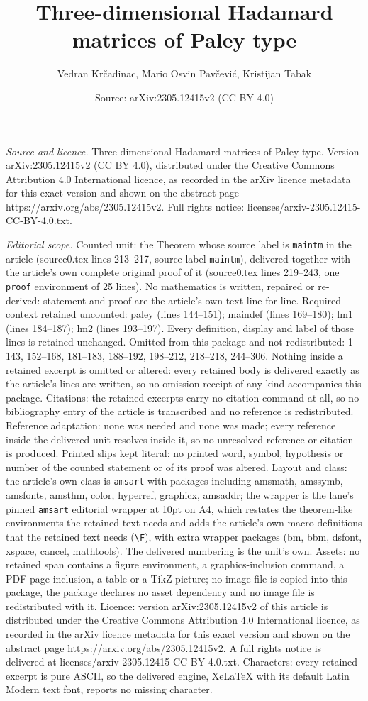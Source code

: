 \documentclass[10pt,a4paper]{amsart}
\title[Three-dimensional Hadamard matrices of Paley type]{Three-dimensional Hadamard matrices of Paley type}
\author{Vedran Kr\v{c}adinac, Mario Osvin Pav\v{c}evi\'c, Kristijan Tabak}
\date{Source: arXiv:2305.12415v2 (CC BY 4.0)}
\begin{document}
\maketitle

\noindent\emph{Source and licence.} Three-dimensional Hadamard matrices of Paley type. Version arXiv:2305.12415v2 (CC BY 4.0), distributed under the Creative Commons Attribution 4.0 International licence, as recorded in the arXiv licence metadata for this exact version and shown on the abstract page https://arxiv.org/abs/2305.12415v2. Full rights notice: licenses/arxiv-2305.12415-CC-BY-4.0.txt.\par\smallskip

\noindent\textit{Editorial scope.} Counted unit: the Theorem whose source label is \texttt{maintm} in the article (source0.tex lines 213--217, source label \texttt{maintm}), delivered together with the article's own complete original proof of it (source0.tex lines 219--243, one \texttt{proof} environment of 25 lines). No mathematics is written, repaired or re-derived: statement and proof are the article's own text line for line. Required context retained uncounted: paley (lines 144--151); maindef (lines 169--180); lm1 (lines 184--187); lm2 (lines 193--197). Every definition, display and label of those lines is retained unchanged. Omitted from this package and not redistributed: 1--143, 152--168, 181--183, 188--192, 198--212, 218--218, 244--306. Nothing inside a retained excerpt is omitted or altered: every retained body is delivered exactly as the article's lines are written, so no omission receipt of any kind accompanies this package. Citations: the retained excerpts carry no citation command at all, so no bibliography entry of the article is transcribed and no reference is redistributed. Reference adaptation: none was needed and none was made; every reference inside the delivered unit resolves inside it, so no unresolved reference or citation is produced. Printed slips kept literal: no printed word, symbol, hypothesis or number of the counted statement or of its proof was altered. Layout and class: the article's own class is \texttt{amsart} with packages including amsmath, amssymb, amsfonts, amsthm, color, hyperref, graphicx, amsaddr; the wrapper is the lane's pinned \texttt{amsart} editorial wrapper at 10pt on A4, which restates the theorem-like environments the retained text needs and adds the article's own macro definitions that the retained text needs (\texttt{\textbackslash F}), with extra wrapper packages (bm, bbm, dsfont, xspace, cancel, mathtools). The delivered numbering is the unit's own. Assets: no retained span contains a figure environment, a graphics-inclusion command, a PDF-page inclusion, a table or a TikZ picture; no image file is copied into this package, the package declares no asset dependency and no image file is redistributed with it. Licence: version arXiv:2305.12415v2 of this article is distributed under the Creative Commons Attribution 4.0 International licence, as recorded in the arXiv licence metadata for this exact version and shown on the abstract page https://arxiv.org/abs/2305.12415v2. A full rights notice is delivered at licenses/arxiv-2305.12415-CC-BY-4.0.txt. Characters: every retained excerpt is pure ASCII, so the delivered engine, XeLaTeX with its default Latin Modern text font, reports no missing character.
\end{document}
